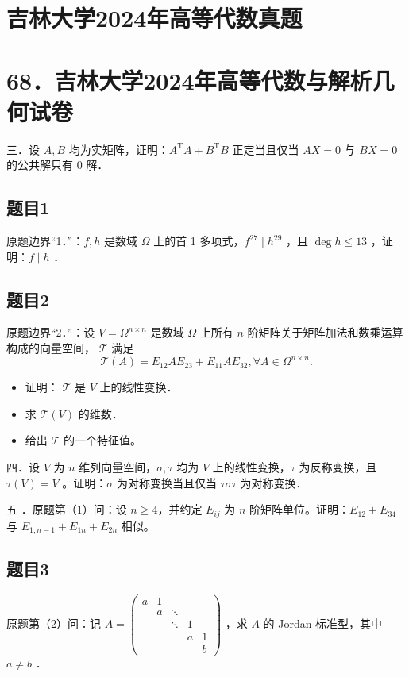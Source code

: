 \documentclass{article}
\begin{document}
\section*{吉林大学2024年高等代数真题}
\section*{68．吉林大学2024年高等代数与解析几何试卷}
三．设 \(A, B\) 均为实矩阵，证明：\(A^{\mathrm{T}} A+B^{\mathrm{T}} B\) 正定当且仅当 \(A X=0\) 与 \(B X=0\) 的公共解只有 0 解．

\begin{itemize}
\end{itemize}

\subsection{题目1}
原题边界“1．”：\(f, h\) 是数域 \(\Omega\) 上的首 1 多项式，\(f^{27} \mid h^{29}\) ，且 \(\operatorname{deg} h \leq 13\) ，证明：\(f \mid h\) ．

\subsection{题目2}
原题边界“2．”：设 \(V=\Omega^{n \times n}\) 是数域 \(\Omega\) 上所有 \(n\) 阶矩阵关于矩阵加法和数乘运算构成的向量空间， \(\mathcal{T}\) 满足
\[
\mathcal{T}(A)=E_{12} A E_{23}+E_{11} A E_{32}, \forall A \in \Omega^{n \times n} .
\]

\begin{itemize}
\item[（1）] 证明： \(\mathcal{T}\) 是 \(V\) 上的线性变换．
  \item[（2）] 求 \(\mathcal{T}(V)\) 的维数．
  \item[（3）] 给出 \(\mathcal{T}\) 的一个特征值。
\end{itemize}

四．设 \(V\) 为 \(n\) 维列向量空间，\(\sigma, \tau\) 均为 \(V\) 上的线性变换，\(\tau\) 为反称变换，且 \(\tau(V)=V\) 。证明：\(\sigma\) 为对称变换当且仅当 \(\tau \sigma \tau\) 为对称变换．

五 ．原题第（1）问：设 \(n\ge 4\)，并约定 \(E_{ij}\) 为 \(n\) 阶矩阵单位。证明：\(E_{12}+E_{34}\) 与 \(E_{1, n-1}+E_{1 n}+E_{2 n}\) 相似。\\

\subsection{题目3}
原题第（2）问：记 \(A=\left(\begin{array}{ccccc}a & 1 & & & \\ & a & \ddots & & \\ & & \ddots & 1 & \\ & & & a & 1 \\ & & & & b\end{array}\right)\) ，求 \(A\) 的 Jordan 标准型，其中 \(a \neq b\) ．
\end{document}
